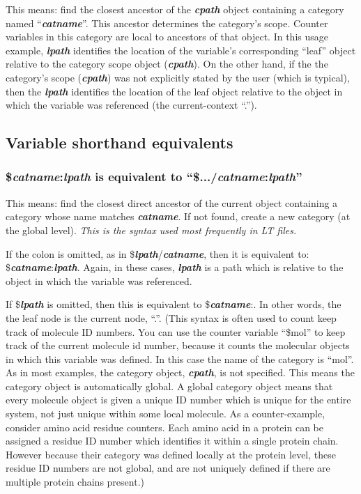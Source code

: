\documentclass[11pt]{article}
\begin{document}
This means: find the closest ancestor of the \textit{\textbf{cpath}} object containing a category named ``\textit{\textbf{catname}}''.  This ancestor determines the category's scope.  Counter variables in this category are local to ancestors of that object.  In this usage example, \textit{\textbf{lpath}} identifies the location of the variable's corresponding ``leaf'' object
relative to the category scope object (\textit{\textbf{cpath}}).  
On the other hand, if the the category's scope (\textit{\textbf{cpath}})
was not explicitly stated by the user (which is typical), 
then the \textit{\textbf{lpath}} identifies the location of the leaf object relative to 
the object in which the variable was referenced 
(the current-context ``.'').

\subsection{Variable shorthand equivalents}
\label{sec:variables_shorthand}

\subsubsection*{\$\textit{\textbf{catname}}:\textit{\textbf{lpath}} is equivalent to ``\$.../\textit{\textbf{catname}}:\textit{\textbf{lpath}}''}
This means: find the closest direct ancestor of the current object containing a category whose name matches \textit{\textbf{catname}}.  If not found, create a new category (at the global level).  \textit{This is the syntax used most frequently in LT files.}

If the colon is omitted, as in \$\textit{\textbf{lpath}}/\textit{\textbf{catname}}, 
then it is equivalent to: \$\textit{\textbf{catname}}:\textit{\textbf{lpath}}.
Again, in these cases, \textit{\textbf{lpath}} is a path which is relative to the object
in which the variable was referenced.

If \$\textit{\textbf{lpath}} is omitted, then this is equivalent to \$\textit{\textbf{catname}}:.  In other words, the the leaf node is the current node, ``.''.  (This syntax is often used to count keep track of molecule ID numbers.  You can use the counter variable ``\$mol'' to keep track of the current molecule id number, because it counts the molecular objects in which this variable was defined.  In this case the name of the category is ``mol''.  As in most examples, the category object, \textit{\textbf{cpath}}, is not specified.  This means the category object is automatically global.  A global category object means that every molecule object is given a unique ID number which is unique for the entire system, not just unique within some local molecule.  As a counter-example, consider amino acid residue counters.  Each amino acid in a protein can be assigned a residue ID number which identifies it within a single protein chain.   However because their category was defined locally at the protein level, these residue ID numbers are not global, and are not uniquely defined if there are multiple protein chains present.)
\end{document}
